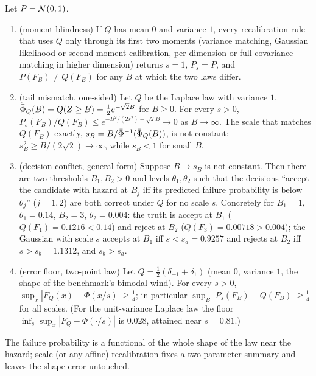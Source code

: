 \begin{theorem}\label{thm:scale}
Let $P=\mathcal{N}(0,1)$.
\begin{enumerate}
\item[(a)] (moment blindness) If $Q$ has mean $0$ and variance $1$, every recalibration rule that uses $Q$ only through its first two moments (variance matching, Gaussian likelihood or second-moment calibration, per-dimension or full covariance matching in higher dimension) returns $s=1$, $P_s=P$, and $P(F_B)\ne Q(F_B)$ for any $B$ at which the two laws differ.
\item[(b)] (tail mismatch, one-sided) Let $Q$ be the Laplace law with variance $1$, $\bar\Phi_Q(B)=Q(Z\ge B)=\tfrac12e^{-\sqrt2B}$ for $B\ge0$. For every $s>0$,
$P_s(F_B)/Q(F_B)\le e^{-B^2/(2s^2)+\sqrt2B}\to0$ as $B\to\infty$.
The scale that matches $Q(F_B)$ exactly, $s_B=B/\bar\Phi^{-1}(\bar\Phi_Q(B))$, is not constant: $s_B^2\ge B/(2\sqrt2)\to\infty$, while $s_B<1$ for small $B$.
\item[(c)] (decision conflict, general form) Suppose $B\mapsto s_B$ is not constant. Then there are two thresholds $B_1,B_2>0$ and levels $\theta_1,\theta_2$ such that the decisions ``accept the candidate with hazard at $B_j$ iff its predicted failure probability is below $\theta_j$'' ($j=1,2$) are both correct under $Q$ for no scale $s$.
Concretely for $B_1=1$, $\theta_1=0.14$, $B_2=3$, $\theta_2=0.004$: the truth is accept at $B_1$ ($Q(F_{1})=0.1216<0.14$) and reject at $B_2$ ($Q(F_3)=0.00718>0.004$); the Gaussian with scale $s$ accepts at $B_1$ iff $s<s_a=0.9257$ and rejects at $B_2$ iff $s>s_b=1.1312$, and $s_b>s_a$.
\item[(d)] (error floor, two-point law) Let $Q=\frac12(\delta_{-1}+\delta_{1})$ (mean $0$, variance $1$, the shape of the benchmark's bimodal wind). For every $s>0$, $\sup_x|F_Q(x)-\Phi(x/s)|\ge\tfrac14$; in particular $\sup_B|P_s(F_B)-Q(F_B)|\ge\tfrac14$ for all scales. (For the unit-variance Laplace law the floor $\inf_s\sup_x|F_Q-\Phi(\cdot/s)|$ is $0.028$, attained near $s=0.81$.)
\end{enumerate}
The failure probability is a functional of the whole shape of the law near the hazard; scale (or any affine) recalibration fixes a two-parameter summary and leaves the shape error untouched.
\end{theorem}
